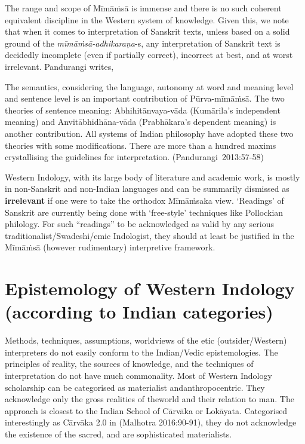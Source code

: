 The range and scope of Mīmāṁsā is immense and there is no such coherent equivalent discipline in the Western system of knowledge. Given this, we note that when it comes to interpretation of Sanskrit texts, unless based on a solid ground of the \hbox{{\sl mīmāṁsā-adhikaraṇa}-s,} any interpretation of Sanskrit text is decidedly incomplete (even if partially correct), incorrect at best, and at worst irrelevant. Pandurangi writes,
\begin{myquote}
The semantics, considering the language, autonomy at word and meaning level and sentence level is an important contribution of Pūrva-mīmāṁ\-sā. The two theories of sentence meaning: Abhihitānvaya-vāda (Kumārila's independent meaning) and Anvitābhidhāna-vāda (Prabhākara's dependent meaning) is another contribution. All systems of Indian philosophy have adopted these two theories with some modifications. There are more than a hundred maxims crystallising the guidelines for interpretation. \hfill \hbox{(Pandurangi 2013:57-58)}
\end{myquote}

Western Indology, with its large body of literature and academic work, is mostly in non-Sanskrit and non-Indian languages and can be summarily dismissed as {\bf irrelevant} if one were to take the orthodox Mīmāṁsaka view. `Readings' of Sanskrit are currently being done with `free-style' techniques like Pollockian philology. For such ``readings'' to be acknowledged as valid by any serious traditionalist/Swadeshi/emic Indologist, they should at least be justified in the Mīmāṁsā (however rudimentary) interpretive framework. 

\section*{Epistemology of Western Indology (according to Indian categories)}

Methods, techniques, assumptions, worldviews of the etic (outsider/\-Western) interpreters do not easily conform to the Indian/Vedic epistemologies. The principles of reality, the sources of knowledge, and the techniques of interpretation do not have much commonality. Most of Western Indology scholarship can be categorised as materialist and\break anthropocentric. They acknowledge only the gross realities of the\break world and their relation to man. The approach is closest to the Indian School of Cārvāka or Lokāyata. Categorised interestingly as Cārvāka 2.0 in (Malhotra 2016:90-91), they do not acknowledge the existence of the sacred, and are sophisticated materialists.

